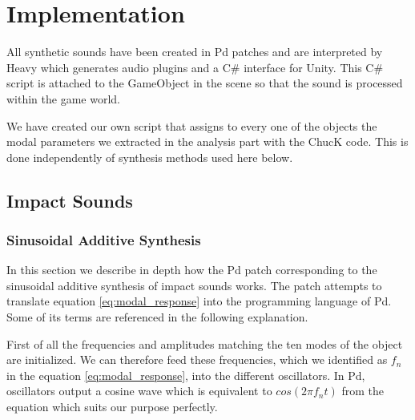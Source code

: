 \chapter{Implementation}\label{ch:implementation}


%

All synthetic sounds have been created in Pd patches and are interpreted by Heavy which generates audio plugins and a C\# interface for Unity. This C\# script is attached to the GameObject in the scene so that the sound is processed within the game world.

We have created our own script that assigns to every one of the objects  the modal parameters we extracted in the analysis part with the ChucK code. This is done independently of synthesis methods used here below.

\section{Impact Sounds}
%
\subsection{Sinusoidal Additive Synthesis}

In this section we describe in depth how the Pd patch corresponding to the sinusoidal additive synthesis of impact sounds works. The patch attempts to translate equation \ref{eq:modal_response} into the programming language of Pd. Some of its terms are referenced in the following explanation.

First of all the frequencies and amplitudes matching the ten modes of the object are initialized. We can therefore feed these frequencies, which we identified as $f_n$ in the equation \ref{eq:modal_response}, into the different oscillators. In Pd, oscillators output a cosine wave which is equivalent to $cos(2 \pi f_nt)$ from the equation which suits our purpose perfectly.

